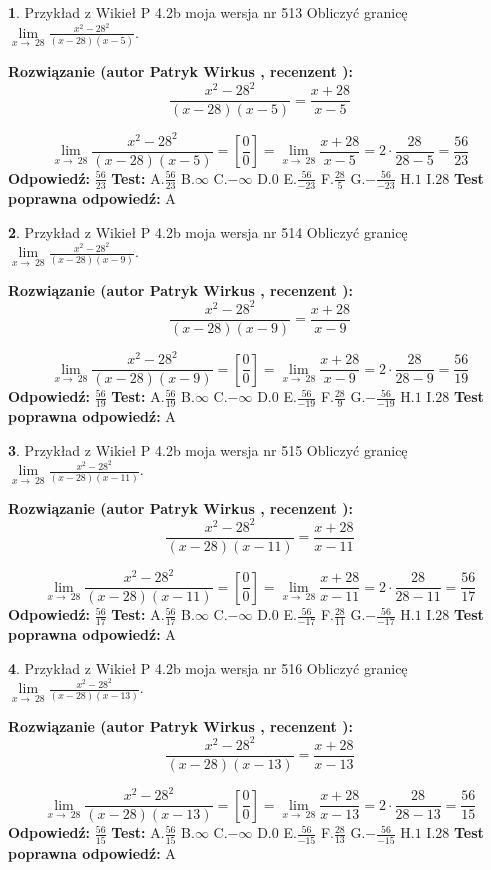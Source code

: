 \documentclass[12pt, a4paper]{article}
\theoremstyle{definition} %
\newtheorem{zad}{}
\newcommand{\zadStart}[1]{\begin{zad}#1\newline}
\newcommand{\zadStop}{\end{zad}}
\newcommand{\rozwStart}[2]{\noindent \textbf{Rozwiązanie (autor #1 , recenzent #2): }\newline}
\newcommand{\rozwStop}{\newline}
\newcommand{\odpStart}{\noindent \textbf{Odpowiedź:}\newline}
\newcommand{\odpStop}{\newline}
\newcommand{\testStart}{\noindent \textbf{Test:}\newline}
\newcommand{\testStop}{\newline}
\newcommand{\kluczStart}{\noindent \textbf{Test poprawna odpowiedź:}\newline}
\newcommand{\kluczStop}{\newline}
\begin{document}
\zadStart{Przykład z Wikieł P 4.2b moja wersja nr 513}
Obliczyć granicę $\lim\limits_{x\to\ 28}\frac{x^{2}-28^{2}}{(x-28)(x-5)}$.
\zadStop
\rozwStart{Patryk Wirkus}{}
$$\frac{x^{2}-28^{2}}{(x-28)(x-5)}=\frac{x+28}{x-5}$$

$$\lim\limits_{x\to\ 28}\frac{x^{2}-28^{2}}{(x-28)(x-5)}=[\frac{0}{0}]=\lim\limits_{x\to\ 28}\frac{x+28}{x-5}=2 \cdot \frac{28}{28-5} = \frac{56}{23}$$
\rozwStop
\odpStart
$\frac{56}{23}$
\odpStop
\testStart
A.$\frac{56}{23}$
B.$\infty$
C.$-\infty$
D.$0$
E.$\frac{56}{-23}$
F.$\frac{28}{5}$
G.$-\frac{56}{-23}$
H.$1$
I.$28$
\testStop
\kluczStart
A
\kluczStop



\zadStart{Przykład z Wikieł P 4.2b moja wersja nr 514}
Obliczyć granicę $\lim\limits_{x\to\ 28}\frac{x^{2}-28^{2}}{(x-28)(x-9)}$.
\zadStop
\rozwStart{Patryk Wirkus}{}
$$\frac{x^{2}-28^{2}}{(x-28)(x-9)}=\frac{x+28}{x-9}$$

$$\lim\limits_{x\to\ 28}\frac{x^{2}-28^{2}}{(x-28)(x-9)}=[\frac{0}{0}]=\lim\limits_{x\to\ 28}\frac{x+28}{x-9}=2 \cdot \frac{28}{28-9} = \frac{56}{19}$$
\rozwStop
\odpStart
$\frac{56}{19}$
\odpStop
\testStart
A.$\frac{56}{19}$
B.$\infty$
C.$-\infty$
D.$0$
E.$\frac{56}{-19}$
F.$\frac{28}{9}$
G.$-\frac{56}{-19}$
H.$1$
I.$28$
\testStop
\kluczStart
A
\kluczStop



\zadStart{Przykład z Wikieł P 4.2b moja wersja nr 515}
Obliczyć granicę $\lim\limits_{x\to\ 28}\frac{x^{2}-28^{2}}{(x-28)(x-11)}$.
\zadStop
\rozwStart{Patryk Wirkus}{}
$$\frac{x^{2}-28^{2}}{(x-28)(x-11)}=\frac{x+28}{x-11}$$

$$\lim\limits_{x\to\ 28}\frac{x^{2}-28^{2}}{(x-28)(x-11)}=[\frac{0}{0}]=\lim\limits_{x\to\ 28}\frac{x+28}{x-11}=2 \cdot \frac{28}{28-11} = \frac{56}{17}$$
\rozwStop
\odpStart
$\frac{56}{17}$
\odpStop
\testStart
A.$\frac{56}{17}$
B.$\infty$
C.$-\infty$
D.$0$
E.$\frac{56}{-17}$
F.$\frac{28}{11}$
G.$-\frac{56}{-17}$
H.$1$
I.$28$
\testStop
\kluczStart
A
\kluczStop



\zadStart{Przykład z Wikieł P 4.2b moja wersja nr 516}
Obliczyć granicę $\lim\limits_{x\to\ 28}\frac{x^{2}-28^{2}}{(x-28)(x-13)}$.
\zadStop
\rozwStart{Patryk Wirkus}{}
$$\frac{x^{2}-28^{2}}{(x-28)(x-13)}=\frac{x+28}{x-13}$$

$$\lim\limits_{x\to\ 28}\frac{x^{2}-28^{2}}{(x-28)(x-13)}=[\frac{0}{0}]=\lim\limits_{x\to\ 28}\frac{x+28}{x-13}=2 \cdot \frac{28}{28-13} = \frac{56}{15}$$
\rozwStop
\odpStart
$\frac{56}{15}$
\odpStop
\testStart
A.$\frac{56}{15}$
B.$\infty$
C.$-\infty$
D.$0$
E.$\frac{56}{-15}$
F.$\frac{28}{13}$
G.$-\frac{56}{-15}$
H.$1$
I.$28$
\testStop
\kluczStart
A
\kluczStop
\end{document}
